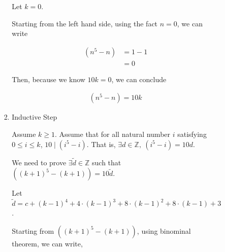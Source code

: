 \documentclass[12pt]{article}
\begin{document}
\begin{itemize}
\begin{itemize}
\begin{itemize}
\begin{mdframed}
\begin{enumerate}[1.]
\begin{mdframed}
                    \bigskip

                    Let $k = 0$.

                    \bigskip

                    Starting from the left hand side, using the fact $n = 0$,
                    we can write

                    \begin{align}
                        (n^5 - n) &= 1 - 1\\
                        &= 0
                    \end{align}

                    \bigskip

                    Then, because we know $10k = 0$, we can conclude

                    \begin{align}
                        (n^5 - n) = 10k
                    \end{align}

                    \end{mdframed}

                    \item Inductive Step

                    \begin{mdframed}

                    Assume $k \geq 1$. Assume that for all natural number $i$ satisfying $0 \leq i \leq k$, $10 \mid (i^5 - i)$.
                    That is, $\exists d \in \mathbb{Z},\:(i^5 - i) = 10d$.

                    \bigskip

                    We need to prove $\exists \tilde{d} \in \mathbb{Z}$ such that
                    $((k+1)^5 - (k+1)) = 10 \tilde{d}$.

                    \bigskip

                    Let $\tilde{d} = c + (k-1)^4 + 4 \cdot (k-1)^3 + 8 \cdot (k-1)^2 +
                    8 \cdot(k-1) + 3$.

                    \bigskip

                    Starting from $((k+1)^5 - (k+1))$, using binominal theorem, we can write,


\end{mdframed}
\end{enumerate}
\end{mdframed}
\end{itemize}
\end{itemize}
\end{itemize}
\end{document}
